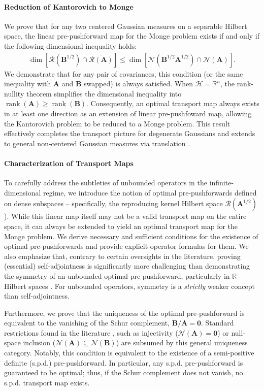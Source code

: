 \documentclass[noinfoline]{imsart}\setcounter{tocdepth}{2}
\renewcommand{\b}[1]{\mathbb{#1}} %
\newcommand{\m}[1]{\mathbf{#1}} %
\renewcommand{\c}[1]{\mathcal{#1}} %
\DeclareMathOperator*{\rk}{rank}
\theoremstyle{plain}
\begin{document}
\paragraph{Reduction of Kantorovich to Monge} We prove that for any two centered Gaussian measures on a separable Hilbert space, the linear pre-pushforward map for the Monge problem exists if and only if the following dimensional inequality holds:
\begin{align*}
    \dim [\c{R}(\m{B}^{1/2}) \cap \overline{\c{R}(\m{A})}] \le \dim [\c{N}(\m{B}^{1/2} \m{A}^{1/2}) \cap \c{N}(\m{A})].
\end{align*}
We demonstrate that for any pair of covariances, this condition (or the same inequality with $\m{A}$ and $\m{B}$ swapped) is always satisfied. When $\c{H} = \b{R}^{n}$, the rank-nullity theorem simplifies the dimensional inequality into $\rk (\m{A}) \ge \rk (\m{B})$. Consequently, an optimal transport map always exists in at least one direction as an extension of linear pre-pushfoward map, allowing the Kantorovich problem to be reduced to a Monge problem. This result effectively completes the transport picture for degenerate Gaussians and extends to general non-centered Gaussian measures via translation \cite{panaretos2020invitation}.

\paragraph{Characterization of Transport Maps} 
To carefully address the subtleties of unbounded operators in the infinite-dimensional regime, we introduce the notion of optimal pre-pushforwards defined on dense subspaces -- specifically, the reproducing kernel Hilbert space $\c{R}(\m{A}^{1/2})$ \cite{da2006introduction, paulsen2016introduction}). While this linear map itself may not be a valid transport map on the entire space, it can always be extended to yield an optimal transport map for the Monge problem. We derive necessary and sufficient conditions for the existence of optimal pre-pushforwards and provide explicit operator formulas for them. We also emphasize that, contrary to certain oversights in the literature, proving (essential) self-adjointness is significantly more challenging than demonstrating the symmetry of an unbounded optimal pre-pushforward, particularly in $\b{R}$-Hilbert spaces \cite{conway2019course, hall2013quantum, reed1980methods}. For unbounded operators, symmetry is a \textit{strictly} weaker concept than self-adjointness.

Furthermore, we prove that the uniqueness of the optimal pre-pushforward is equivalent to the vanishing of the Schur complement, $\m{B}/\m{A} = \m{0}$. 
Standard restrictions found in the literature \cite{masarotto2019procrustes, cuesta1989notes}, such as injectivity ($\c{N}(\m{A}) = \m{0}$) or null-space inclusion ($\c{N}(\m{A}) \subseteq \c{N}(\m{B})$) are subsumed by this general uniqueness category. Notably, this condition is equivalent to the existence of a semi-positive definite (s.p.d.) pre-pushforward. In particular, any s.p.d. pre-pushforward is guaranteed to be optimal; thus, if the Schur complement does not vanish, no s.p.d. transport map exists.
\end{document}
